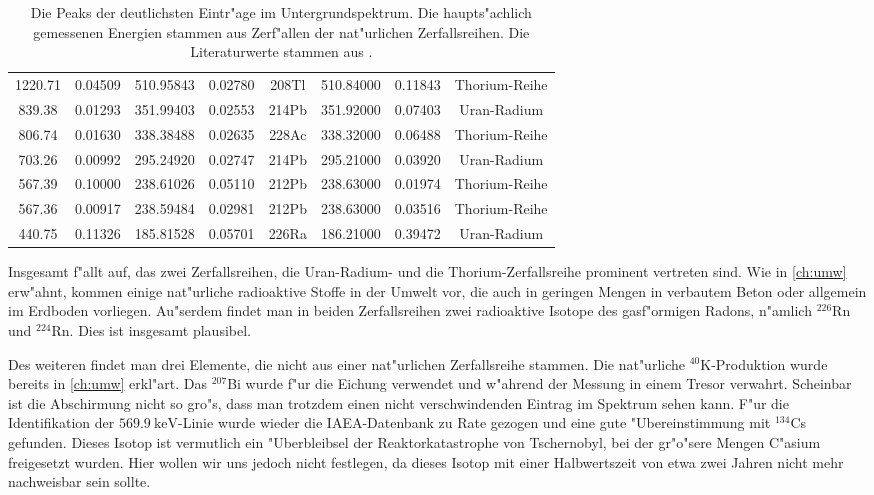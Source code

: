 \documentclass[12pt]{article}
\begin{document}
\begin{table}[h!]
{\begin{tabular}{cccccccc}
			1220.71 & 0.04509 & 510.95843 & 0.02780 & 208Tl & 510.84000 & 0.11843 & Thorium-Reihe \\
			\rowcolor[rgb]{ .949,  .949,  .949} 839.38 & 0.01293 & 351.99403 & 0.02553 & 214Pb & 351.92000 & 0.07403 & Uran-Radium \\
			806.74 & 0.01630 & 338.38488 & 0.02635 & 228Ac & 338.32000 & 0.06488 & Thorium-Reihe \\
			\rowcolor[rgb]{ .949,  .949,  .949} 703.26 & 0.00992 & 295.24920 & 0.02747 & 214Pb & 295.21000 & 0.03920 & Uran-Radium \\
			567.39 & 0.10000 & 238.61026 & 0.05110 & 212Pb & 238.63000 & 0.01974 & Thorium-Reihe \\
			\rowcolor[rgb]{ .949,  .949,  .949} 567.36 & 0.00917 & 238.59484 & 0.02981 & 212Pb & 238.63000 & 0.03516 & Thorium-Reihe \\
			440.75 & 0.11326 & 185.81528 & 0.05701 & 226Ra & 186.21000 & 0.39472 & Uran-Radium \\
		\end{tabular}%
	}
	\caption{Die Peaks der deutlichsten Eintr"age im Untergrundspektrum. Die haupts"achlich gemessenen Energien stammen aus Zerf"allen der nat"urlichen Zerfallsreihen. Die Literaturwerte stammen aus \cite{cite1}.}
	\label{tab:untergrund}
\end{table}%
\noindent
Insgesamt f"allt auf, das zwei Zerfallsreihen, die Uran-Radium- und die Thorium-Zerfallsreihe prominent vertreten sind. Wie in \ref{ch:umw} erw"ahnt, kommen einige nat"urliche radioaktive Stoffe in der Umwelt vor, die auch in geringen Mengen in verbautem Beton oder allgemein im Erdboden vorliegen. Au"serdem findet man in beiden Zerfallsreihen zwei radioaktive Isotope des gasf"ormigen Radons, n"amlich $^{226}$Rn und $^{224}$Rn. Dies ist insgesamt plausibel.\par 
Des weiteren findet man drei Elemente, die nicht aus einer nat"urlichen Zerfallsreihe stammen. Die nat"urliche $^{40}$K-Produktion wurde bereits in \ref{ch:umw} erkl"art. Das $^{207}$Bi wurde f"ur die Eichung verwendet und w"ahrend der Messung in einem Tresor verwahrt. Scheinbar ist die Abschirmung nicht so gro"s, dass man trotzdem einen nicht verschwindenden Eintrag im Spektrum sehen kann. F"ur die Identifikation der $\SI{569.9}{\kilo\electronvolt}$-Linie wurde wieder die IAEA-Datenbank \cite{IAEA} zu Rate gezogen und eine gute "Ubereinstimmung mit $^{134}$Cs gefunden. Dieses Isotop ist vermutlich ein "Uberbleibsel der Reaktorkatastrophe von Tschernobyl, bei der gr"o"sere Mengen C"asium freigesetzt wurden. Hier wollen wir uns jedoch nicht festlegen, da dieses Isotop mit einer Halbwertszeit von etwa zwei Jahren nicht mehr nachweisbar sein sollte. \par 
\end{document}
